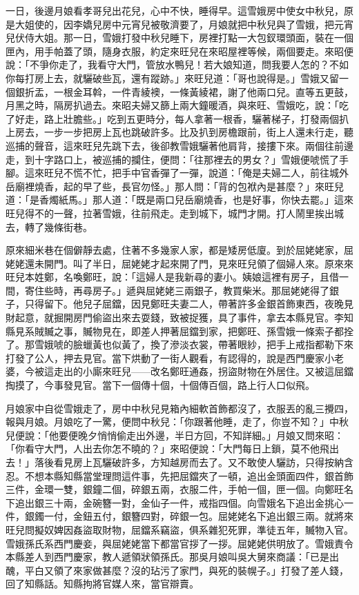 一日，後邊月娘看孝哥兒出花兒，心中不快，睡得早。這雪娥房中使女中秋兒，原是大姐使的，因李嬌兒房中元宵兒被敬濟要了，月娘就把中秋兒與了雪娥，把元宵兒伏侍大姐。那一日，雪娥打發中秋兒睡下，房裡打點一大包釵環頭面，裝在一個匣內，用手帕蓋了頭，隨身衣服，約定來旺兒在來昭屋裡等候，兩個要走。來昭便說：「不爭你走了，我看守大門，管放水鴨兒！若大娘知道，問我要人怎的？不如你每打房上去，就驪破些瓦，還有蹤跡。」來旺兒道：「哥也說得是。」雪娥又留一個銀折盂，一根金耳斡，一件青綾襖，一條黃綾裙，謝了他兩口兒。直等五更鼓，月黑之時，隔房扒過去。來昭夫婦又篩上兩大鐘暖酒，與來旺、雪娥吃，說：「吃了好走，路上壯膽些。」吃到五更時分，每人拿著一根香，驪著梯子，打發兩個扒上房去，一步一步把房上瓦也跳破許多。比及扒到房檐跟前，街上人還未行走，聽巡捕的聲音，這來旺兒先跳下去，後卻教雪娥驪著他肩背，接摟下來。兩個往前邊走，到十字路口上，被巡捕的攔住，便問：「往那裡去的男女？」雪娥便唬慌了手腳。這來旺兒不慌不忙，把手中官香彈了一彈，說道：「俺是夫婦二人，前往城外岳廟裡燒香，起的早了些，長官勿怪。」那人問：「背的包袱內是甚麼？」來旺兒道：「是香燭紙馬。」那人道：「既是兩口兒岳廟燒香，也是好事，你快去罷。」這來旺兒得不的一聲，拉著雪娥，往前飛走。走到城下，城門才開。打人鬧里挨出城去，轉了幾條街巷。

原來細米巷在個僻靜去處，住著不多幾家人家，都是矮房低廈。到於屈姥姥家，屈姥姥還未開門。叫了半日，屈姥姥才起來開了門，見來旺兒領了個婦人來。原來來旺兒本姓鄭，名喚鄭旺，說：「這婦人是我新尋的妻小。姨娘這裡有房子，且借一間，寄住些時，再尋房子。」遞與屈姥姥三兩銀子，教買柴米。那屈姥姥得了銀子，只得留下。他兒子屈鐺，因見鄭旺夫妻二人，帶著許多金銀首飾東西，夜晚見財起意，就掘開房門偷盜出來去耍錢，致被捉獲，具了事件，拿去本縣見官。李知縣見系賊贓之事，贓物見在，即差人押著屈鐺到家，把鄭旺、孫雪娥一條索子都拴了。那雪娥唬的臉蠟黃也似黃了，換了滲淡衣裳，帶著眼紗，把手上戒指都勒下來打發了公人，押去見官。當下烘動了一街人觀看，有認得的，說是西門慶家小老婆，今被這走出的小廝來旺兒——改名鄭旺通姦，拐盜財物在外居住。又被這屈鐺掏摸了，今事發見官。當下一個傳十個，十個傳百個，路上行人口似飛。

月娘家中自從雪娥走了，房中中秋兒見箱內細軟首飾都沒了，衣服丟的亂三攪四，報與月娘。月娘吃了一驚，便問中秋兒：「你跟著他睡，走了，你豈不知？」中秋兒便說：「他要便晚夕悄悄偷走出外邊，半日方回，不知詳細。」月娘又問來昭：「你看守大門，人出去你怎不曉的？」來昭便說：「大門每日上鎖，莫不他飛出去！」落後看見房上瓦驪破許多，方知越房而去了。又不敢使人驪訪，只得按納含忍。不想本縣知縣當堂理問這件事，先把屈鐺夾了一頓，追出金頭面四件，銀首飾三件，金環一雙，銀鐘二個，碎銀五兩，衣服二件，手帕一個，匣一個。向鄭旺名下追出銀三十兩，金碗簪一對，金仙子一件，戒指四個。向雪娥名下追出金挑心一件，銀鐲一付，金鈕五付，銀簪四對，碎銀一包。屈姥姥名下追出銀三兩。就將來旺兒問擬奴婢因姦盜取財物，屈鐺系竊盜，俱系雜犯死罪，準徒五年，贓物入官。雪娥孫氏系西門慶妾，與屈姥姥當下都當官拶了一拶。屈姥姥供明放了。雪娥責令本縣差人到西門慶家，教人遞領狀領孫氏。那吳月娘叫吳大舅來商議：「已是出醜，平白又領了來家做甚麼？沒的玷污了家門，與死的裝幌子。」打發了差人錢，回了知縣話。知縣拘將官媒人來，當官辯賣。

